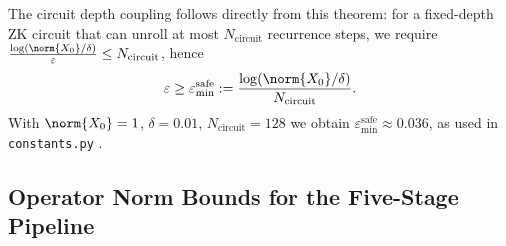 \documentclass[11pt]{article}
\begin{document}
The circuit depth coupling follows directly from this theorem:
for a fixed-depth ZK circuit that can unroll at most $N_{\text{circuit}}$ recurrence steps,
we require $\frac{\log(\norm{X_0}/\delta)}{\varepsilon}\le N_{\text{circuit}}$,
hence
\begin{equation}
    \varepsilon \ge \varepsilon_{\min}^{\text{safe}} := \frac{\log(\norm{X_0}/\delta)}{N_{\text{circuit}}}.
\end{equation}
With $\norm{X_0}=1$, $\delta=0.01$, $N_{\text{circuit}}=128$ we obtain
$\varepsilon_{\min}^{\text{safe}}\approx 0.036$, as used in \texttt{constants.py}
\cite{code_file:136}.

\subsection{Operator Norm Bounds for the Five-Stage Pipeline}
\label{app:pipeline}
\end{document}
